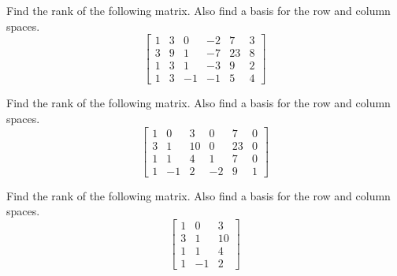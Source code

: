 \documentclass{ximera}
\begin{document}
\begin{problem}\label{prb:5.33} Find the rank of the following matrix. Also find a basis for the row
and column spaces.
\begin{equation*}
\left[
\begin{array}{rrrrrr}
1 & 3 & 0 & -2 & 7 & 3 \\
3 & 9 & 1 & -7 & 23 & 8 \\
1 & 3 & 1 & -3 & 9 & 2 \\
1 & 3 & -1 & -1 & 5 & 4
\end{array}
\right]
\end{equation*}
\end{problem}

\begin{problem}\label{prb:5.34} Find the rank of the following matrix. Also find a basis for the row
and column spaces.
\begin{equation*}
\left[
\begin{array}{rrrrrr}
1 & 0 & 3 & 0 & 7 & 0 \\
3 & 1 & 10 & 0 & 23 & 0 \\
1 & 1 & 4 & 1 & 7 & 0 \\
1 & -1 & 2 & -2 & 9 & 1
\end{array}
\right]
\end{equation*}
\end{problem}

\begin{problem}\label{prb:5.35} Find the rank of the following matrix. Also find a basis for the row
and column spaces.
\begin{equation*}
\left[
\begin{array}{rrr}
1 & 0 & 3 \\
3 & 1 & 10 \\
1 & 1 & 4 \\
1 & -1 & 2
\end{array}
\right]
\end{equation*}
\end{problem}
\end{document}
